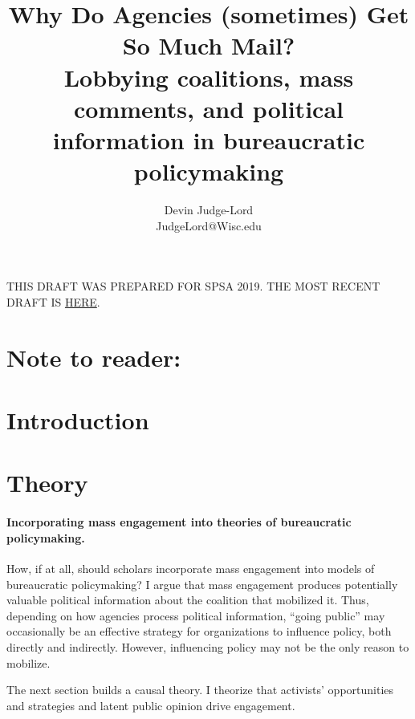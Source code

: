\documentclass{article}
\title{Why Do Agencies (sometimes) Get So Much Mail? \\
Lobbying coalitions, mass comments, and political information in bureaucratic policymaking}
\author{Devin Judge-Lord \\ JudgeLord@Wisc.edu}
\begin{document}
\maketitle

\centering THIS DRAFT WAS PREPARED FOR SPSA 2019. THE MOST RECENT DRAFT IS \href{https://github.com/judgelord/dissertation/raw/master/whyMail.pdf}{HERE}.

\abstract{}


\newpage
\tableofcontents

\newpage
\section*{Note to reader:}


\doublespace
% 

\newpage
\section{Introduction} \label{intro}


\section{Theory} 
\paragraph{Incorporating mass engagement into theories of bureaucratic policymaking.}
How, if at all, should scholars incorporate mass engagement into models of bureaucratic policymaking? 
I argue that mass engagement produces potentially valuable political information about the coalition that mobilized it.
Thus, depending on how agencies process political information, ``going public'' may occasionally be an effective strategy for organizations to influence policy, both directly and indirectly. However, influencing policy may not be the only reason to mobilize. 

The next section builds a causal theory. I theorize that activists' opportunities and strategies and latent public opinion drive engagement.
\end{document}
